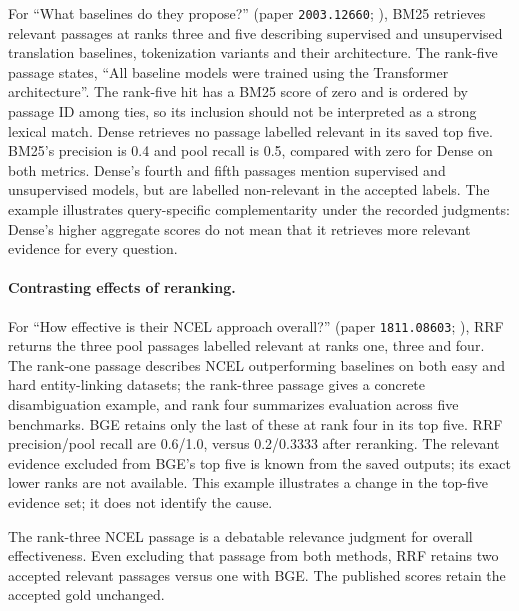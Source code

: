 For ``What baselines do they propose?'' (paper \texttt{2003.12660}; \citep{ahia2020pidgin}), BM25 retrieves relevant passages at ranks three and five describing supervised and unsupervised translation baselines, tokenization variants and their architecture. The rank-five passage states, ``All baseline models were trained using the Transformer architecture''. The rank-five hit has a BM25 score of zero and is ordered by passage ID among ties, so its inclusion should not be interpreted as a strong lexical match. Dense retrieves no passage labelled relevant in its saved top five. BM25's precision is 0.4 and pool recall is 0.5, compared with zero for Dense on both metrics. Dense's fourth and fifth passages mention supervised and unsupervised models, but are labelled non-relevant in the accepted labels. The example illustrates query-specific complementarity under the recorded judgments: Dense's higher aggregate scores do not mean that it retrieves more relevant evidence for every question.

\paragraph{Contrasting effects of reranking.}
For ``How effective is their NCEL approach overall?'' (paper \texttt{1811.08603}; \citep{cao2018ncel}), RRF returns the three pool passages labelled relevant at ranks one, three and four. The rank-one passage describes NCEL outperforming baselines on both easy and hard entity-linking datasets; the rank-three passage gives a concrete disambiguation example, and rank four summarizes evaluation across five benchmarks. BGE retains only the last of these at rank four in its top five. RRF precision/pool recall are 0.6/1.0, versus 0.2/0.3333 after reranking. The relevant evidence excluded from BGE's top five is known from the saved outputs; its exact lower ranks are not available. This example illustrates a change in the top-five evidence set; it does not identify the cause.


The rank-three NCEL passage is a debatable relevance judgment for overall effectiveness. Even excluding that passage from both methods, RRF retains two accepted relevant passages versus one with BGE. The published scores retain the accepted gold unchanged.

